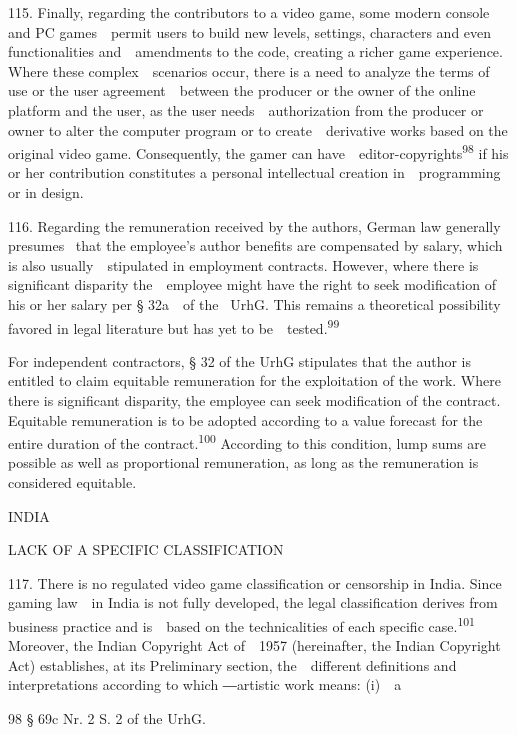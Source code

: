 \documentclass[
]{article}
\begin{document}
{115. }{Finally, regarding the contributors to a video game, some modern
console and PC games~~permit users to build new levels, settings,
characters and even functionalities and~~amendments to the code,
creating a richer game experience. Where these complex~~scenarios occur,
there is a need to analyze the terms of use or the user
agreement~~between the producer or the owner of the online platform and
the user, as the user needs~~authorization from the producer or owner to
alter the computer program or to create~~derivative works based on the
original video game. Consequently, the gamer can
have~~editor-copyrights}\textsuperscript{{98 }}{if his or her
contribution constitutes a personal intellectual creation
in~~programming or in design.}

{116. }{Regarding the remuneration received by the authors, German law
generally presumes }{~that the employee's }{author benefits are
compensated by salary, which is also usually~~stipulated in employment
contracts. However, where there is significant disparity the~~employee
might have the right to seek modification of his or her salary per §
32a~~of the }{~UrhG}{. This remains a theoretical possibility favored in
legal literature but has yet to be~~tested.}\textsuperscript{{99}}

{For independent contractors, § 32 of the }{UrhG }{stipulates that the
author is entitled to claim equitable remuneration for the exploitation
of the work. Where there is significant disparity, the employee can seek
modification of the contract. Equitable remuneration is to be adopted
according to a value forecast for the entire duration of the
contract.}\textsuperscript{{100 }}{According to this condition, lump
sums are possible as well as proportional remuneration, as long as the
remuneration is considered equitable.}

{INDIA}

{LACK OF A SPECIFIC CLASSIFICATION}

{117. }{There is no regulated video game classification or censorship in
India. Since gaming law~~in India is not fully developed, the legal
classification derives from business practice and is~~based on the
technicalities of each specific case.}\textsuperscript{{101 }}{Moreover,
the Indian }{Copyright Act of~~1957 }{(hereinafter, the Indian
}{Copyright Act}{) establishes, at its Preliminary section,
the~~different definitions a}{nd interpretations according to which
―}{artistic work means: (i)~~a}

{98 }{§ 69c Nr. 2 S. 2 of the }{UrhG}{.}
\end{document}
